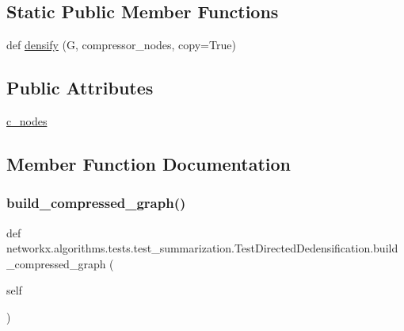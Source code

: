 \subsection*{Static Public Member Functions}
\begin{DoxyCompactItemize}
\item 
def \hyperlink{classnetworkx_1_1algorithms_1_1tests_1_1test__summarization_1_1TestDirectedDedensification_a652625526dc99a9d27ad484f12569440}{densify} (G, compressor\+\_\+nodes, copy=True)
\end{DoxyCompactItemize}
\subsection*{Public Attributes}
\begin{DoxyCompactItemize}
\item 
\hyperlink{classnetworkx_1_1algorithms_1_1tests_1_1test__summarization_1_1TestDirectedDedensification_abdd65ffa6f578b005bc68520c755ede0}{c\+\_\+nodes}
\end{DoxyCompactItemize}


\subsection{Member Function Documentation}
\mbox{\label{classnetworkx_1_1algorithms_1_1tests_1_1test__summarization_1_1TestDirectedDedensification_aac867f2f2cdee5f585e941e87a737f1d}} 
\subsubsection{\texorpdfstring{build\+\_\+compressed\+\_\+graph()}{build\_compressed\_graph()}}
{\footnotesize\ttfamily def networkx.\+algorithms.\+tests.\+test\+\_\+summarization.\+Test\+Directed\+Dedensification.\+build\+\_\+compressed\+\_\+graph (\begin{DoxyParamCaption}\item[{}]{self }\end{DoxyParamCaption})}

